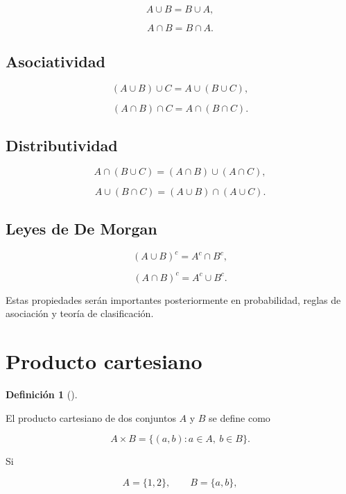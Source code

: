 \documentclass[
  spanish,
  10.5pt,
  letterpaper,
  DIV=11,
  numbers=noendperiod,
  oneside,
  open=any]{scrreprt}
\theoremstyle{definition}
\newtheorem{definition}{Definición}[chapter]
\theoremstyle{definition}
\theoremstyle{plain}
\theoremstyle{remark}
\begin{document}
\[
A\cup B=B\cup A,
\]

\[
A\cap B=B\cap A.
\]

\subsection*{Asociatividad}\label{asociatividad}

\[
(A\cup B)\cup C=A\cup(B\cup C),
\]

\[
(A\cap B)\cap C=A\cap(B\cap C).
\]

\subsection*{Distributividad}\label{distributividad}

\[
A\cap(B\cup C)
=
(A\cap B)\cup(A\cap C),
\]

\[
A\cup(B\cap C)
=
(A\cup B)\cap(A\cup C).
\]

\subsection*{Leyes de De Morgan}\label{leyes-de-de-morgan}

\[
(A\cup B)^c=A^c\cap B^c,
\]

\[
(A\cap B)^c=A^c\cup B^c.
\]

Estas propiedades serán importantes posteriormente en probabilidad,
reglas de asociación y teoría de clasificación.

\section*{Producto cartesiano}\label{producto-cartesiano}


\begin{definition}[]\protect\hypertarget{def-producto-cartesiano}{}\label{def-producto-cartesiano}

El producto cartesiano de dos conjuntos \(A\) y \(B\) se define como

\[
A\times B
=
\{(a,b):a\in A,\ b\in B\}.
\]

\end{definition}

Si

\[
A=\{1,2\},
\qquad
B=\{a,b\},
\]
\end{document}
